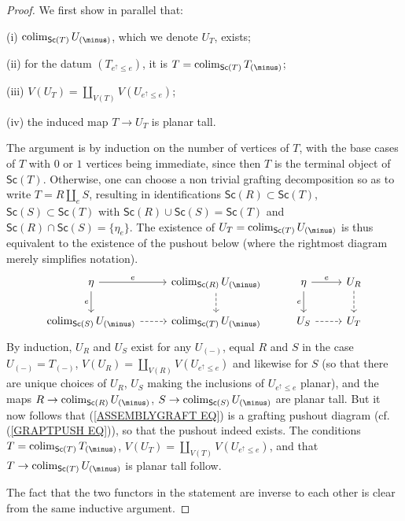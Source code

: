 \documentclass[a4paper,10pt]{article}%
\begin{document}
\begin{proof}
We first show in parallel that:
\begin{inparaenum}
\item[(i)] $\colim_{\mathsf{Sc}(T)} U_{(\minus)}$, which we denote $U_T$, exists;
\item[(ii)] for the datum $\left(T_{e^{\uparrow}\leq e}\right)$, it is $T = \colim_{\mathsf{Sc}(T)} T_{(\minus)}$;
\item[(iii)] $V(U_T) = \coprod_{V(T)} V(U_{e^{\uparrow} \leq e})$;
\item[(iv)] the induced map
$T \to U_T$ is planar tall.
\end{inparaenum}
 
The argument is by induction on the number of vertices of $T$, with the base cases of $T$ with $0$ or $1$ vertices being immediate, since then $T$ is the terminal object of $\mathsf{Sc}(T)$.
Otherwise, one can choose a non trivial grafting decomposition so as to write $T = R \amalg_e S$, resulting 
in identifications 
$\mathsf{Sc}(R) \subset \mathsf{Sc}(T)$, 
$\mathsf{Sc}(S) \subset \mathsf{Sc}(T)$
with  %
$\mathsf{Sc}(R) \cup \mathsf{Sc}(S) = \mathsf{Sc}(T)$
and 
$\mathsf{Sc}(R) \cap \mathsf{Sc}(S) = \{\eta_e \}$.
The existence of $U_T = \colim_{\mathsf{Sc}(T)}U_{(\minus)}$
is thus equivalent to the existence of the pushout below
(where the rightmost diagram merely simplifies notation).
\begin{equation}\label{ASSEMBLYGRAFT EQ}
\begin{tikzcd}
	\eta \ar{r}{e} \ar{d}[swap]{e} & \colim_{\mathsf{Sc}(R)}U_{(\minus)} \ar[dashed,d] &
	\eta \ar{r}{e} \ar{d}[swap]{e} & U_R \ar[dashed,d]	
\\
	\colim_{\mathsf{Sc}(S)}U_{(\minus)} \ar[dashed,r] &
	\colim_{\mathsf{Sc}(T)}U_{(\minus)} &
	U_S \ar[dashed,r] &
	U_T
\end{tikzcd}
\end{equation}
By induction, $U_R$ and $U_S$ exist for any $U_{(\minus)}$, 
equal $R$ and $S$ in the case $U_{(\minus)} = T_{(\minus)}$,
$V(U_R) = \coprod_{V(R)} V(U_{e^{\uparrow} \leq e})$
and likewise for $S$ (so that there are unique choices of $U_R$, $U_S$ making the inclusions of $U_{e^{\uparrow} \leq e}$ planar),
and the maps 
$R \to \colim_{\mathsf{Sc}(R)}U_{(\minus)}$,
$S \to \colim_{\mathsf{Sc}(S)}U_{(\minus)}$
are planar tall.
But it now follows that (\ref{ASSEMBLYGRAFT EQ}) is a grafting pushout diagram (cf. (\ref{GRAPTPUSH EQ})), so that the pushout indeed exists. The conditions
$T = \colim_{\mathsf{Sc}(T)}T_{(\minus)}$,
$V(U_T) = \coprod_{V(T)} V(U_{e^{\uparrow} \leq e})$, 
and that
$T \to \colim_{\mathsf{Sc}(T)}U_{(\minus)}$
is planar tall follow.

The fact that the two functors in the statement
are inverse to each other is clear from the same inductive argument.
\end{proof}
\end{document}
